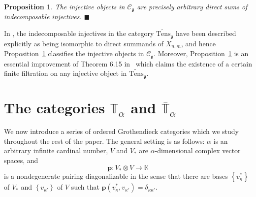 \documentclass[11pt]{article}
\theoremstyle{plain}
\newtheorem{proposition}[lemma]{Proposition}
\theoremstyle{nonumberplain}
\theoremstyle{plain}
\theoremstyle{nonumberplain}
\newcommand\bK{\mathbb K}
\newcommand\bT{\mathbb T}
\newcommand\cC{\mathcal C}
\newcommand\fg{\mathfrak{g}}
\newcommand{\qedhere}{\mbox{}\hfill\ensuremath{\blacksquare}}
\begin{document}
\begin{proposition}
  The injective objects in $\cC_\fg$ are precisely {arbitrary} direct sums
  of indecomposable {injectives.}  \qedhere
\label{prop_inj}
\end{proposition}

{In \cite[Corollary 6.7]{PS1}, the indecomposable injectives in the
  category $\widetilde{\mathrm{Tens}}_\fg$ have been described explicitly as being
  isomorphic to direct summands of $X_{n,m}$, and hence
  Proposition~\ref{prop_inj} classifies the injective objects in
  $\cC_\fg$.}  Moreover, Proposition~\ref{prop_inj} is an essential
improvement of Theorem 6.15 in~\cite{PS1} which claims the existence of a
certain finite filtration on any injective object in
$\widetilde{\mathrm{Tens}}_\fg$.






\section{The categories $\bT_\alpha$ and $\bar{\bT}_\alpha$}\label{se.ta} 



We now introduce a series of ordered Grothendieck categories which we
study throughout the rest of {the} paper. The general setting is as
follows: $\alpha$ is an arbitrary infinite cardinal number, $V$ and $V_*$ are
$\alpha$-dimensional complex vector spaces, and
\begin{equation*}
  \mathbf{p} :V_*\otimes V\to \bK
\end{equation*}
is a nondegenerate pairing diagonalizable in the sense that there are bases
$\left\{v^*_\kappa\right\}$ of $V_*$ and $\left\{v_{\kappa'}\right\}$ of $V$ such that $\mathbf{p}\left(v_\kappa^*,v_{\kappa'}\right)=\delta_{\kappa\kappa'}$.
\end{document}
